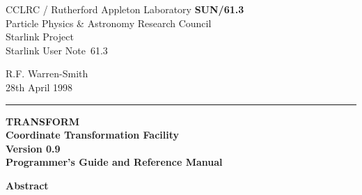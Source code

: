 \documentclass[twoside,11pt]{article}
\newcommand{\stardoccategory}  {Starlink User Note}
\newcommand{\stardocinitials}  {SUN}
\newcommand{\stardocnumber}    {61.3}
\newcommand{\stardocauthors}   {R.F. Warren-Smith}
\newcommand{\stardocdate}      {28th April 1998}
\newcommand{\stardoctitle}     {TRANSFORM \\[2.5ex]
                                Coordinate Transformation Facility}
\newcommand{\stardocversion}   {Version 0.9}
\newcommand{\stardocmanual}    {Programmer's Guide and Reference Manual}
\newcommand{\stardocname}{\stardocinitials /\stardocnumber}
\newenvironment{latexonly}{}{}
\begin{document}
\thispagestyle{empty}

\begin{latexonly}
   CCLRC / {\sc Rutherford Appleton Laboratory} \hfill {\bf \stardocname}\\
   {\large Particle Physics \& Astronomy Research Council}\\
   {\large Starlink Project\\}
   {\large \stardoccategory\ \stardocnumber}
   \begin{flushright}
   \stardocauthors\\
   \stardocdate
   \end{flushright}
   \vspace{-4mm}
   \rule{\textwidth}{0.5mm}
   \vspace{5mm}
   \begin{center}
   {\Huge\bf  \stardoctitle \\ [2.5ex]}
   {\LARGE\bf \stardocversion \\ [4ex]}
   {\Huge\bf  \stardocmanual}
   \end{center}
   \vspace{5mm}


   \vspace{10mm}
   \begin{center}
      {\Large\bf Abstract}
   \end{center}
\end{latexonly}
\end{document}
